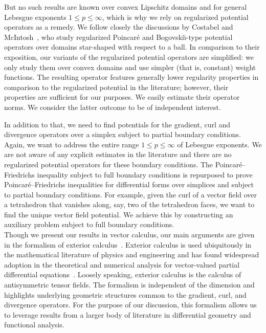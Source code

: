 \documentclass[10pt,letterpaper]{article}
\begin{document}
But no such results are known over convex Lipschitz domains and for general Lebesgue exponents $1 \leq p \leq \infty$, which is why we rely on regularized potential operators as a remedy. 
We follow closely the discussions by Costabel and McIntosh~\cite{costabel2010bogovskiui},
who study regularized Poincar\'e and Bogovski\u{\i}-type potential operators over domains star-shaped with respect to a ball. 
In comparison to their exposition, our variants of the regularized potential operators are simplified:
we only study them over convex domains and use simpler (that is, constant) weight functions. 
The resulting operator features generally lower regularity properties in comparison to the regularized potential in the literature;
however, their properties are sufficient for our purposes. We easily estimate their operator norms. 
We consider the latter outcome to be of independent interest. 

In addition to that, we need to find potentials for the gradient, curl and divergence operators over a simplex subject to partial boundary conditions. 
Again, we want to address the entire range $1 \leq p \leq \infty$ of Lebesgue exponents. 
We are not aware of any explicit estimates in the literature and there are no regularized potential operators for these boundary conditions. 
The Poincar\'e--Friedrichs inequality subject to full boundary conditions is repurposed to prove Poincar\'e--Friedrichs inequalities for differential forms over simplices and subject to partial boundary conditions. 
For example, given the curl of a vector field over a tetrahedron that vanishes along, say, two of the tetrahedron faces, we want to find the unique vector field potential. We achieve this by constructing an auxiliary problem subject to full boundary conditions.
\\



Though we present our results in vector calculus, our main arguments are given in the formalism of exterior calculus~\cite{greub1967multilinear,lee2012smooth}. Exterior calculus is used ubiquitously in the mathematical literature of physics and engineering and has found widespread adoption in the theoretical and numerical analysis for vector-valued partial differential equations~\cite{hiptmair2002finite,gross2004electromagnetic,arnold2006finite,arnold2009geometric,arnold2010finite,demlow2014posteriori,licht2021local,arnold2021complexes}. Loosely speaking, exterior calculus is the calculus of antisymmetric tensor fields. The formalism is independent of the dimension and highlights underlying geometric structures common to the gradient, curl, and divergence operators.
For the purpose of our discussion, this formalism allows us to leverage results from a larger body of literature in differential geometry and functional analysis. 
\\ 
\end{document}
